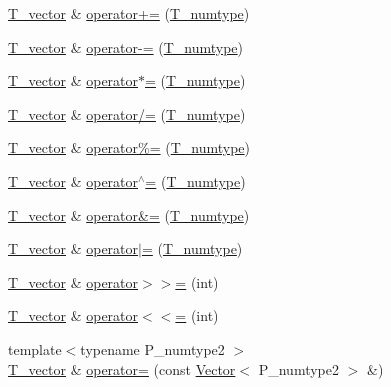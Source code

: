 \begin{DoxyCompactItemize}
\hyperlink{classVector_a29e279edfeac4d65aad0d814c05cfaf0}{T\+\_\+vector} \& \hyperlink{classVector_ae6f0c304e2f19045a66596fe377c9ded}{operator+=} (\hyperlink{classVector_a63dfe9fb06d8b4595b9e8fb10fc0755e}{T\+\_\+numtype})
\item 
\hyperlink{classVector_a29e279edfeac4d65aad0d814c05cfaf0}{T\+\_\+vector} \& \hyperlink{classVector_ae482f641d50266866b3e6833346d18e0}{operator-\/=} (\hyperlink{classVector_a63dfe9fb06d8b4595b9e8fb10fc0755e}{T\+\_\+numtype})
\item 
\hyperlink{classVector_a29e279edfeac4d65aad0d814c05cfaf0}{T\+\_\+vector} \& \hyperlink{classVector_ae85423189216115c3743268cf9e5f438}{operator$\ast$=} (\hyperlink{classVector_a63dfe9fb06d8b4595b9e8fb10fc0755e}{T\+\_\+numtype})
\item 
\hyperlink{classVector_a29e279edfeac4d65aad0d814c05cfaf0}{T\+\_\+vector} \& \hyperlink{classVector_aa7a06b212e58ba9cc0294e93da54e6d3}{operator/=} (\hyperlink{classVector_a63dfe9fb06d8b4595b9e8fb10fc0755e}{T\+\_\+numtype})
\item 
\hyperlink{classVector_a29e279edfeac4d65aad0d814c05cfaf0}{T\+\_\+vector} \& \hyperlink{classVector_a0977ef3c46804df5c04d898373f04901}{operator\%=} (\hyperlink{classVector_a63dfe9fb06d8b4595b9e8fb10fc0755e}{T\+\_\+numtype})
\item 
\hyperlink{classVector_a29e279edfeac4d65aad0d814c05cfaf0}{T\+\_\+vector} \& \hyperlink{classVector_a13bb0ced94d8f73123a7546c6ac7272f}{operator$^\wedge$=} (\hyperlink{classVector_a63dfe9fb06d8b4595b9e8fb10fc0755e}{T\+\_\+numtype})
\item 
\hyperlink{classVector_a29e279edfeac4d65aad0d814c05cfaf0}{T\+\_\+vector} \& \hyperlink{classVector_a2679bad3b06dc63cd6acbaba24156b56}{operator\&=} (\hyperlink{classVector_a63dfe9fb06d8b4595b9e8fb10fc0755e}{T\+\_\+numtype})
\item 
\hyperlink{classVector_a29e279edfeac4d65aad0d814c05cfaf0}{T\+\_\+vector} \& \hyperlink{classVector_af46cb3889d26cc5744b0df5ce098845e}{operator$\vert$=} (\hyperlink{classVector_a63dfe9fb06d8b4595b9e8fb10fc0755e}{T\+\_\+numtype})
\item 
\hyperlink{classVector_a29e279edfeac4d65aad0d814c05cfaf0}{T\+\_\+vector} \& \hyperlink{classVector_ae8553205210d81238549061a2e07bb52}{operator$>$$>$=} (int)
\item 
\hyperlink{classVector_a29e279edfeac4d65aad0d814c05cfaf0}{T\+\_\+vector} \& \hyperlink{classVector_a22b701f3db1f081ecc33116a3ef35908}{operator$<$$<$=} (int)
\item 
{\footnotesize template$<$typename P\+\_\+numtype2 $>$ }\\\hyperlink{classVector_a29e279edfeac4d65aad0d814c05cfaf0}{T\+\_\+vector} \& \hyperlink{classVector_a4cb2df8d0b7961117ee374c0ad575b3b}{operator=} (const \hyperlink{classVector}{Vector}$<$ P\+\_\+numtype2 $>$ \&)

\end{DoxyCompactItemize}
